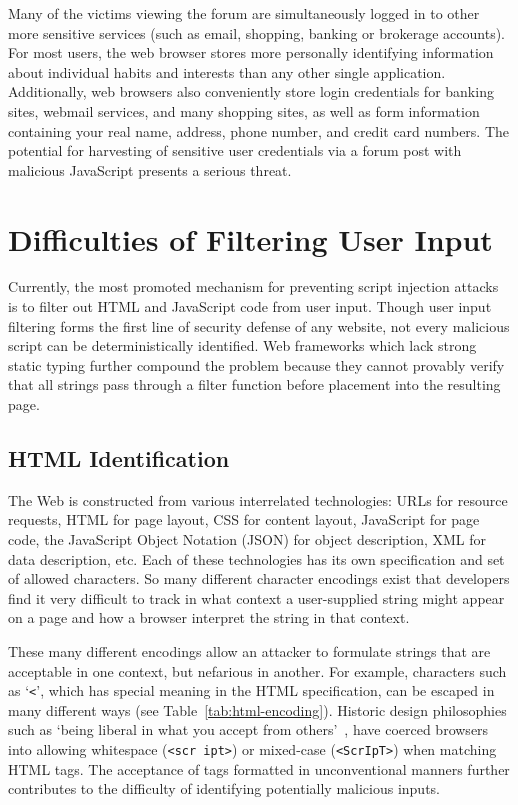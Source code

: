 Many of the victims viewing the forum are simultaneously logged in to other more sensitive services (such as email, shopping, banking or brokerage accounts).
For most users, the web browser stores more personally identifying information about individual habits and interests than any other single application.
Additionally, web browsers also conveniently store login credentials for banking sites, webmail services, and many shopping sites, as well as form information containing your real name, address, phone number, and credit card numbers.
The potential for harvesting of sensitive user credentials via a forum post with malicious JavaScript presents a serious threat.

\section{Difficulties of Filtering User Input}

Currently, the most promoted mechanism for preventing script injection attacks is to filter out HTML and JavaScript code from user input.
Though user input filtering forms the first line of security defense of any website, not every malicious script can be deterministically identified.
Web frameworks which lack strong static typing further compound the problem because they cannot provably verify that all strings pass through a filter function before placement into the resulting page.

\subsection{HTML Identification}
\label{subsec:html-encoding}

The Web is constructed from various interrelated technologies: URLs for resource requests, HTML for page layout, CSS for content layout, JavaScript for page code, the JavaScript Object Notation (JSON) for object description, XML for data description, etc.
Each of these technologies has its own specification and set of allowed characters.
So many different character encodings exist that developers find it very difficult to track in what context a user-supplied string might appear on a page and how a browser interpret the string in that context.

These many different encodings allow an attacker to formulate strings that are acceptable in one context, but nefarious in another.
For example, characters such as `\texttt{<}', which has special meaning in the HTML specification, can be escaped in many different ways (see Table~\ref{tab:html-encoding}).
Historic design philosophies such as `being liberal in what you accept from others'~\cite{rfc761}, have coerced browsers into allowing whitespace (\texttt{<scr ipt>}) or mixed-case (\texttt{<ScrIpT>}) when matching HTML tags.
The acceptance of tags formatted in unconventional manners further contributes to the difficulty of identifying potentially malicious inputs.

